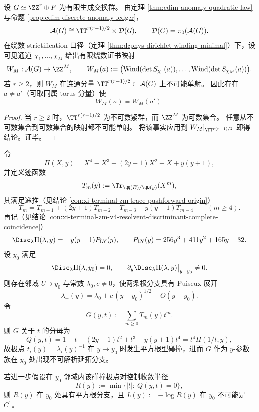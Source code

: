 \begin{proposition}[有限条奇异环绕数证书对连续异常自由度的不可完备性]\label{prop:conclusion-finite-winding-certificate-incompleteness}
设 \(G\simeq \ZZ^r\oplus F\) 为有限生成交换群。
由定理 \ref{thm:cdim-anomaly-quadratic-law} 与命题 \ref{prop:cdim-discrete-anomaly-ledger}，
\[
\mathcal A(G)\cong \TT^{r(r-1)/2}\times \mathcal D(G),
\qquad
\mathcal D(G)=\pi_0(\mathcal A(G)).
\]
在绕数 strictification 口径（定理 \ref{thm:dephys-dirichlet-winding-minimal}）下，设可见通道
\(\chi_1,\dots,\chi_M\)
给出有限绕数证书映射
\[
W_M:\mathcal A(G)\to \ZZ^M,\qquad
W_M(a):=\bigl(\mathrm{Wind}(\det S_{\chi_1}(a)),\dots,\mathrm{Wind}(\det S_{\chi_M}(a))\bigr).
\]
若 \(r\ge 2\)，则 \(W_M\) 在连通分量 \(\TT^{r(r-1)/2}\subset \mathcal A(G)\) 上不可能单射。
因此存在 \(a\neq a'\)（可取同属 torus 分量）使
\[
W_M(a)=W_M(a').
\]
\end{proposition}

\begin{proof}
当 \(r\ge 2\) 时，\(\TT^{r(r-1)/2}\) 为不可数紧群，而 \(\ZZ^M\) 为可数集合。
任意从不可数集合到可数集合的映射都不可能单射。
将该事实应用到 \(W_M|_{\TT^{r(r-1)/2}}\) 即得结论。证毕。
\end{proof}

\begin{theorem}\label{thm:conclusion-leyang-discriminant-sqrt-branch-obstruction}
令
\[
\Pi(X,y)=X^4-X^3-(2y+1)X^2+X+y(y+1),
\]
并定义迹函数
\[
T_m(y):=\Tr_{\QQ(E)/\QQ(y)}(X^m),
\]
其满足递推（见结论 \ref{con:xi-terminal-zm-trace-pushforward-origin}）
\[
T_m=T_{m-1}+(2y+1)T_{m-2}-T_{m-3}-y(y+1)T_{m-4}\qquad(m\ge 4).
\]
再记（见结论 \ref{con:xi-terminal-zm-v4-resolvent-discriminant-complete-coincidence}）
\[
\Disc_{\lambda}\Pi(\lambda,y)=-y(y-1)P_{\mathrm{LY}}(y),
\qquad
P_{\mathrm{LY}}(y)=256y^3+411y^2+165y+32.
\]
设 \(y_0\) 满足
\[
\Disc_{\lambda}\Pi(\lambda,y_0)=0,\qquad
\partial_y\Disc_{\lambda}\Pi(\lambda,y)\big|_{y=y_0}\neq 0.
\]
则存在邻域 \(U\ni y_0\) 与常数 \(\lambda_0,c\neq 0\)，使两条根分支具有 Puiseux 展开
\[
\lambda_{\pm}(y)=\lambda_0\pm c\,(y-y_0)^{1/2}+O(y-y_0).
\]
令
\[
G(y,t):=\sum_{m\ge 0}T_m(y)t^m.
\]
则 \(G\) 关于 \(t\) 的分母为
\[
Q(y,t)=1-t-(2y+1)t^2+t^3+y(y+1)t^4=t^4\Pi(1/t,y),
\]
故极点 \(t_i(y)=\lambda_i(y)^{-1}\) 在 \(y\to y_0\) 时发生平方根型碰撞，进而 \(G\) 作为 \(y\)-参数族在 \(y_0\) 处出现不可解析延拓分支。

若进一步假设在 \(y_0\) 邻域内该碰撞极点对控制收敛半径
\[
R(y):=\min\{|t|:\ Q(y,t)=0\},
\]
则 \(R(y)\) 在 \(y_0\) 处具有平方根分支，且
\(
L(y):=-\log R(y)
\)
在 \(y_0\) 不可能是 \(C^1\)。
\end{theorem}


